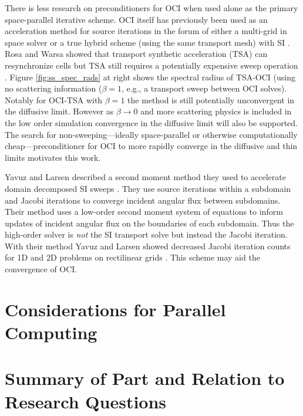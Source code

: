 There is less research on preconditioners for OCI when used alone as the primary space-parallel iterative scheme.
OCI itself has previously been used as an acceleration method for source iterations in the forum of either a multi-grid in space solver \cite{kang2000oci, man1994parallel} or a true hybrid scheme (using the same transport mesh) with SI \cite{hoagland_hybrid_2021}.
Rosa and Warsa showed that transport synthetic acceleration (TSA) can resynchronize cells but TSA still requires a potentially expensive sweep operation \cite{tsa2009rosa}.
Figure \ref{fig:ss_spec_rads} at right shows the spectral radius of TSA-OCI (using no scattering information ($\beta=1$, e.g., a transport sweep between OCI solves).
Notably for OCI-TSA with $\beta=1$ the method is still potentially unconvergent in the diffusive limit.
However as $\beta\rightarrow0$ and more scattering physics is included in the low order simulation convergence in the diffusive limit will also be supported.
The search for non-sweeping---ideally space-parallel or otherwise computationally cheap---preconditioner for OCI to more rapidly converge in the diffusive and thin limits motivates this work.

Yavuz and Larsen described a second moment method they used to accelerate domain decomposed SI sweeps \cite{yavuz_spatial_1989}.
They use source iterations within a subdomain and Jacobi iterations to converge incident angular flux between subdomains.
Their method uses a low-order second moment system of equations to inform updates of incident angular flux on the boundaries of each subdomain.
Thus the high-order solver is \textit{not} the SI transport solve but instead the Jacobi iteration.
With their method Yavuz and Larsen showed decreased Jacobi iteration counts for 1D and 2D problems on rectilinear grids \cite{yavuz_spatial_1989, yavuz_1992_2ddd}.
This scheme may aid the convergence of OCI.


\section{Considerations for Parallel Computing}
\label{c2:hpc}


\section{Summary of Part and Relation to Research Questions}

